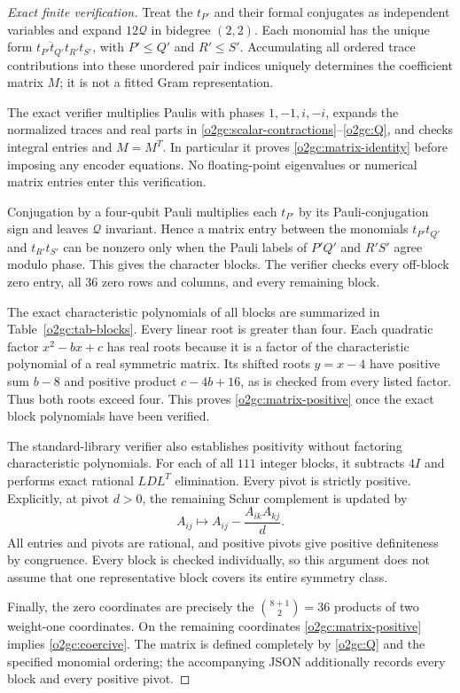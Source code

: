 \begin{proof}[Exact finite verification]
Treat the \(t_{P'}\) and their formal conjugates as independent
variables and expand \(12\mathcal Q\) in bidegree \((2,2)\).
Each monomial has the unique form
\(\overline{t_{P'}t_{Q'}}t_{R'}t_{S'}\), with \(P'\le Q'\) and
\(R'\le S'\). Accumulating all ordered trace contributions into
these unordered pair indices uniquely determines the coefficient
matrix \(M\); it is not a fitted Gram representation.

The exact verifier multiplies Paulis with phases \(1,-1,i,-i\),
expands the normalized traces and real parts in
\eqref{o2gc:scalar-contractions}--\eqref{o2gc:Q}, and checks integral
entries and \(M=M^T\). In particular it proves
\eqref{o2gc:matrix-identity} before imposing any encoder equations.
No floating-point eigenvalues or numerical matrix entries enter
this verification.

Conjugation by a four-qubit Pauli multiplies each \(t_{P'}\) by its
Pauli-conjugation sign and leaves \(\mathcal Q\) invariant. Hence a
matrix entry between the monomials \(t_{P'}t_{Q'}\) and
\(t_{R'}t_{S'}\) can be nonzero only when the Pauli labels of
\(P'Q'\) and \(R'S'\) agree modulo phase. This gives the character
blocks. The verifier checks every off-block zero entry, all \(36\)
zero rows and columns, and every remaining block.

The exact characteristic polynomials of all blocks are summarized
in Table~\ref{o2gc:tab-blocks}. Every linear root is greater than
four. Each quadratic factor \(x^2-bx+c\) has real roots because it
is a factor of the characteristic polynomial of a real symmetric
matrix. Its shifted roots \(y=x-4\) have positive sum \(b-8\) and
positive product \(c-4b+16\), as is checked from every listed factor.
Thus both roots exceed four. This proves
\eqref{o2gc:matrix-positive} once the exact block polynomials have
been verified.

The standard-library verifier also establishes positivity without
factoring characteristic polynomials. For each of all \(111\)
integer blocks, it subtracts \(4I\) and performs exact rational
\(LDL^T\) elimination. Every pivot is strictly positive. Explicitly,
at pivot \(d>0\), the remaining Schur complement is updated by
\[
 A_{ij}\longmapsto A_{ij}-\frac{A_{ik}A_{kj}}{d}.
\]
All entries and pivots are rational, and positive pivots give positive
definiteness by congruence. Every block is checked individually, so
this argument does not assume that one representative block covers
its entire symmetry class.

Finally, the zero coordinates are precisely the
\(\binom{8+1}{2}=36\) products of two weight-one coordinates.
On the remaining coordinates \eqref{o2gc:matrix-positive} implies
\eqref{o2gc:coercive}. The matrix is defined completely by
\eqref{o2gc:Q} and the specified monomial ordering; the accompanying
JSON additionally records every block and every positive pivot.
\end{proof}


